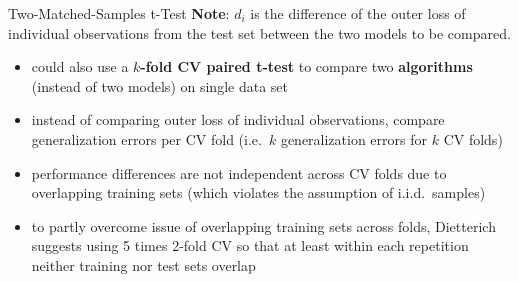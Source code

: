 \begin{frame}[c,allowframebreaks]{Two-Matched-Samples t-Test}
    \textbf{Note}: $d_i$ is the difference of the outer loss of individual observations from the test set between the two models to be compared.

    \begin{itemize}
    \item could also use a \textbf{$k$-fold CV paired t-test} to compare two \textbf{algorithms} (instead of two models) on single data set
    \item instead of comparing outer loss of individual observations, compare
        generalization errors per CV fold (i.e.\ $k$ generalization errors for
        $k$ CV folds)
    \item performance differences are not independent across CV folds due to
        overlapping training sets (which violates the assumption of i.i.d.\
        samples)
    \item to partly overcome issue of overlapping training sets across folds, Dietterich %
     suggests using 5 times 2-fold CV so that at least within each repetition neither training nor test sets overlap 
    \end{itemize}
    \end{frame}

